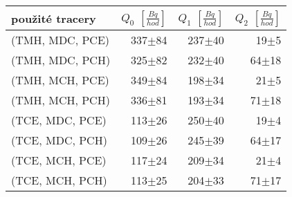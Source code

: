 \begin{tabular}{lrrr}
\toprule
použité tracery & $Q_0$ $\left[\si{\frac{Bq}{hod}}\right]$ & $Q_1$ $\left[\si{\frac{Bq}{hod}}\right]$ & $Q_2$ $\left[\si{\frac{Bq}{hod}}\right]$ \\
\midrule
(TMH, MDC, PCE) &                                 337$\pm$84 &                                 237$\pm$40 &                                   19$\pm$5 \\
(TMH, MDC, PCH) &                                 325$\pm$82 &                                 232$\pm$40 &                                  64$\pm$18 \\
(TMH, MCH, PCE) &                                 349$\pm$84 &                                 198$\pm$34 &                                   21$\pm$5 \\
(TMH, MCH, PCH) &                                 336$\pm$81 &                                 193$\pm$34 &                                  71$\pm$18 \\
(TCE, MDC, PCE) &                                 113$\pm$26 &                                 250$\pm$40 &                                   19$\pm$4 \\
(TCE, MDC, PCH) &                                 109$\pm$26 &                                 245$\pm$39 &                                  64$\pm$17 \\
(TCE, MCH, PCE) &                                 117$\pm$24 &                                 209$\pm$34 &                                   21$\pm$4 \\
(TCE, MCH, PCH) &                                 113$\pm$25 &                                 204$\pm$33 &                                  71$\pm$17 \\
\bottomrule
\end{tabular}
